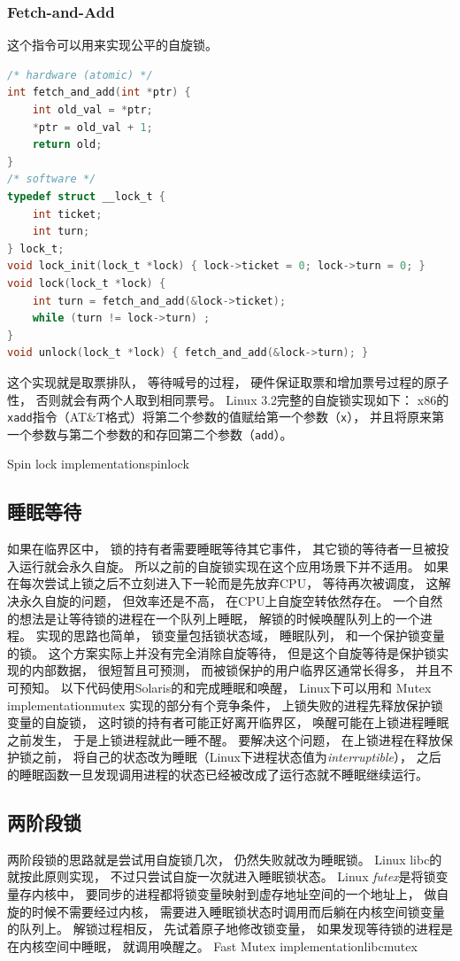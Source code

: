 \documentclass[11pt]{article}
\begin{document}
\subsubsection{Fetch-and-Add}
这个指令可以用来实现公平的自旋锁。
\begin{lstlisting}[language=C]
/* hardware (atomic) */
int fetch_and_add(int *ptr) {
	int old_val = *ptr;
	*ptr = old_val + 1;
	return old;
}
/* software */
typedef struct __lock_t {
	int ticket;
	int turn;
} lock_t;
void lock_init(lock_t *lock) { lock->ticket = 0; lock->turn = 0; }
void lock(lock_t *lock) {
	int turn = fetch_and_add(&lock->ticket);
	while (turn != lock->turn) ;
}
void unlock(lock_t *lock) { fetch_and_add(&lock->turn); }
  \end{lstlisting}
这个实现就是取票排队，
等待喊号的过程，
硬件保证取票和增加票号过程的原子性，
否则就会有两个人取到相同票号。
Linux 3.2完整的自旋锁实现如下：
x86的\verb|xadd|指令（AT\&T格式）将第二个参数的值赋给第一个参数（\verb|x|），
并且将原来第一个参数与第二个参数的和存回第二个参数（\verb|add|）。

              {Spin lock implementation}{spinlock}

\subsection{睡眠等待}
如果在临界区中，
锁的持有者需要睡眠等待其它事件，
其它锁的等待者一旦被投入运行就会永久自旋。
所以之前的自旋锁实现在这个应用场景下并不适用。
如果在每次尝试上锁之后不立刻进入下一轮而是先放弃CPU，
等待再次被调度，
这解决永久自旋的问题，
但效率还是不高，
在CPU上自旋空转依然存在。
一个自然的想法是让等待锁的进程在一个队列上睡眠，
解锁的时候唤醒队列上的一个进程。
实现的思路也简单，
锁变量包括锁状态域，
睡眠队列，
和一个保护锁变量的锁。
这个方案实际上并没有完全消除自旋等待，
但是这个自旋等待是保护锁实现的内部数据，
很短暂且可预测，
而被锁保护的用户临界区通常长得多，
并且不可预知。
以下代码使用Solaris的和完成睡眠和唤醒，
Linux下可以用和
              {Mutex implementation}{mutex}
实现的部分有个竞争条件，
上锁失败的进程先释放保护锁变量的自旋锁，
这时锁的持有者可能正好离开临界区，
唤醒可能在上锁进程睡眠之前发生，
于是上锁进程就此一睡不醒。
要解决这个问题，
在上锁进程在释放保护锁之前，
将自己的状态改为睡眠（Linux下进程状态值为{\em interruptible}），
之后的睡眠函数一旦发现调用进程的状态已经被改成了运行态就不睡眠继续运行。

\subsection{两阶段锁}
两阶段锁的思路就是尝试用自旋锁几次，
仍然失败就改为睡眠锁。
Linux libc的就按此原则实现，
不过只尝试自旋一次就进入睡眠锁状态。
Linux {\em futex}是将锁变量存内核中，
要同步的进程都将锁变量映射到虚存地址空间的一个地址上，
做自旋的时候不需要经过内核，
需要进入睡眠锁状态时调用而后躺在内核空间锁变量的队列上。
解锁过程相反，
先试着原子地修改锁变量，
如果发现等待锁的进程是在内核空间中睡眠，
就调用唤醒之。
              {Fast Mutex implementation}{libcmutex}
\end{document}
